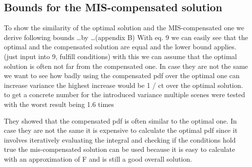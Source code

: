 \subsection{Bounds for the MIS-compensated solution}



To show the similarity of the optimal solution and the MIS-compensated one we derive following bounds \dots by \dots (appendix B)
With eq. 9 we can easily see that the optimal and the compensated solution are equal and the lower bound applies. (just input into 9, fulfill conditions)
with this we can assume that the optimal solution is often not far from the compensated one.
In case they are not the same we want to see how badly using the compensated pdf over the optimal one can increase variance
the highest increase would be 1 / ct over the optimal solution.
to get a concrete number for the introduced variance multiple scenes were tested with the worst result being 1.6 times

They showed that the compensated pdf is often similar to the optimal one.
In case they are not the same it is expensive to calculate the optimal pdf since it involves iteratively evaluating the integral and checking if the conditions hold true
the mis-compensated solution can be used because it is easy to calculate with an approximation of F and is still a good overall solution.



